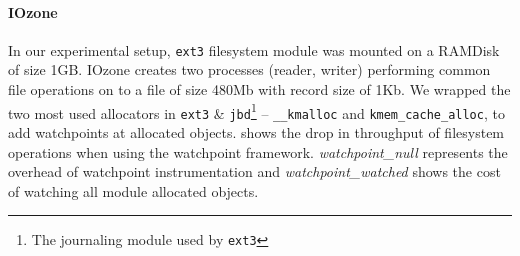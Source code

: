 \documentclass[letterpaper,twocolumn,10pt]{article}
\begin{document}












\paragraph*{IOzone}  In our experimental setup, \texttt{ext3} filesystem module was mounted on a RAMDisk of size 1GB. IOzone creates two processes (reader, writer) performing common file operations on to a file of size 480Mb with record size of 1Kb. We wrapped the two most used allocators in \texttt{ext3} \& \texttt{jbd}\footnote{The journaling module used by \texttt{ext3}} -- \texttt{\_\_kmalloc} and \texttt{kmem\_cache\_alloc}, to add watchpoints at allocated objects.  shows the drop in throughput of filesystem operations when using the watchpoint framework. \emph{watchpoint\_null} represents the overhead of watchpoint instrumentation and \emph{watchpoint\_watched} shows the cost of watching all module allocated objects. 
\end{document}
